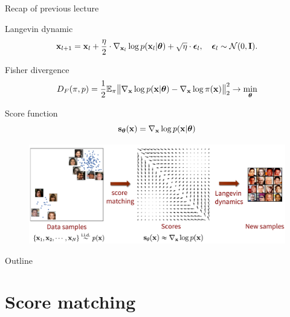 \begin{frame}{Recap of previous lecture}
	\begin{block}{Langevin dynamic}
		\vspace{-0.3cm}
		\[
			\mathbf{x}_{l + 1} = \mathbf{x}_l + \frac{\eta}{2} \cdot \nabla_{\mathbf{x}_l} \log p(\mathbf{x}_l | \boldsymbol{\theta}) + \sqrt{\eta} \cdot \boldsymbol{\epsilon}_l, \quad \boldsymbol{\epsilon}_l \sim \mathcal{N}(0, \mathbf{I}).
		\]
		\vspace{-0.7cm}
	\end{block}
	\begin{block}{Fisher divergence}
		\vspace{-0.3cm}
		\[
			D_F(\pi, p) = \frac{1}{2}\mathbb{E}_{\pi}\bigl\| \nabla_{\mathbf{x}}\log p(\mathbf{x}| \boldsymbol{\theta}) - \nabla_{\mathbf{x}} \log \pi(\mathbf{x}) \bigr\|^2_2 \rightarrow \min_{\boldsymbol{\theta}}
		\]
		\vspace{-0.7cm}
	\end{block}
	\begin{block}{Score function}
		\vspace{-0.5cm}
		 \[
			 \mathbf{s}_{\boldsymbol{\theta}}(\mathbf{x}) = \nabla_{\mathbf{x}}\log p(\mathbf{x}| \boldsymbol{\theta})
		 \]
	 \vspace{-0.8cm}
	\end{block}
	\begin{figure}
		\centering
		\includegraphics[width=0.75\linewidth]{figs/smld}
	\end{figure}
\end{frame}
\begin{frame}{Outline}
	\tableofcontents
\end{frame}
\section{Score matching}
